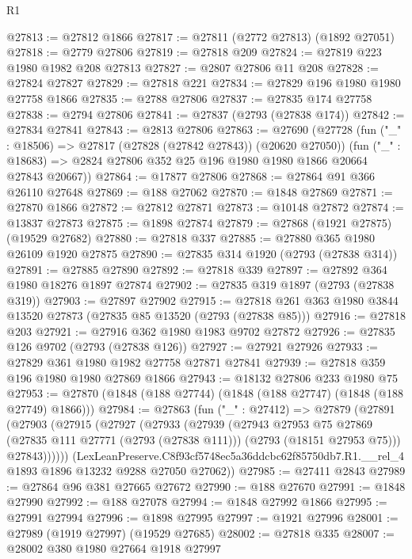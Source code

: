 \begin{lexlean}{R1}
\begin{coremodule}
@27813 := @27812 @1866
@27817 := @27811 (@2772 @27813) (@1892 @27051)
@27818 := @2779 @27806
@27819 := @27818 @209
@27824 := @27819 @223 @1980 @1982 @208 @27813
@27827 := @2807 @27806 @11 @208
@27828 := @27824 @27827
@27829 := @27818 @221
@27834 := @27829 @196 @1980 @1980 @27758 @1866
@27835 := @2788 @27806
@27837 := @27835 @174 @27758
@27838 := @2794 @27806
@27841 := @27837 (@2793 (@27838 @174))
@27842 := @27834 @27841
@27843 := @2813 @27806
@27863 := @27690
    (@27728
      (fun ("_" : @18506) => @27817 (@27828 (@27842 @27843)) (@20620 @27050))
      (fun ("_" : @18683) => @2824 @27806 @352 @25 @196 @1980 @1980 @1866 @20664 @27843 @20667))
@27864 := @17877 @27806
@27868 := @27864 @91 @366 @26110 @27648
@27869 := @188 @27062
@27870 := @1848 @27869
@27871 := @27870 @1866
@27872 := @27812 @27871
@27873 := @10148 @27872
@27874 := @13837 @27873
@27875 := @1898 @27874
@27879 := @27868 (@1921 @27875) (@19529 @27682)
@27880 := @27818 @337
@27885 := @27880 @365 @1980 @26109 @1920 @27875
@27890 := @27835 @314 @1920 (@2793 (@27838 @314))
@27891 := @27885 @27890
@27892 := @27818 @339
@27897 := @27892 @364 @1980 @18276 @1897 @27874
@27902 := @27835 @319 @1897 (@2793 (@27838 @319))
@27903 := @27897 @27902
@27915 := @27818 @261 @363 @1980 @3844 @13520 @27873 (@27835 @85 @13520 (@2793 (@27838 @85)))
@27916 := @27818 @203
@27921 := @27916 @362 @1980 @1983 @9702 @27872
@27926 := @27835 @126 @9702 (@2793 (@27838 @126))
@27927 := @27921 @27926
@27933 := @27829 @361 @1980 @1982 @27758 @27871 @27841
@27939 := @27818 @359 @196 @1980 @1980 @27869 @1866
@27943 := @18132 @27806 @233 @1980 @75
@27953 := @27870 (@1848 (@188 @27744) (@1848 (@188 @27747) (@1848 (@188 @27749) @1866)))
@27984 := @27863
    (fun ("_" : @27412) =>
    @27879
      (@27891
        (@27903
          (@27915
            (@27927
              (@27933
                (@27939
                  (@27943
                    @27953
                    @75
                    @27869
                    (@27835 @111 @27771 (@2793 (@27838 @111)))
                    (@2793 (@18151 @27953 @75)))
                  @27843))))))
      (LexLeanPreserve.C8f93cf5748ec5a36ddcbc62f85750db7.R1.__rel_4
        @1893
        @1896
        @13232
        @9288
        @27050
        @27062))
@27985 := @27411 @2843
@27989 := @27864 @96 @381 @27665 @27672
@27990 := @188 @27670
@27991 := @1848 @27990
@27992 := @188 @27078
@27994 := @1848 @27992 @1866
@27995 := @27991 @27994
@27996 := @1898 @27995
@27997 := @1921 @27996
@28001 := @27989 (@1919 @27997) (@19529 @27685)
@28002 := @27818 @335
@28007 := @28002 @380 @1980 @27664 @1918 @27997

\end{coremodule}
\end{lexlean}
